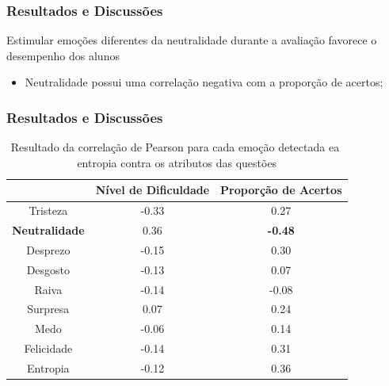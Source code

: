\documentclass{beamer}
\begin{document}

\begin{frame}
\frametitle{Resultados e Discuss\~oes}
\begin{block}{Estimular emo\c{c}\~oes diferentes da neutralidade durante a avalia\c{c}\~ao favorece o desempenho dos alunos}
\begin{itemize}
\pause
\item Neutralidade possui uma correla\c{c}\~ao negativa com a propor\c{c}\~ao de acertos;
\end{itemize}
\end{block}

\end{frame}

\begin{frame}
\frametitle{Resultados e Discuss\~oes}
\begin{table}[]\footnotesize
\centering
\caption{Resultado​ ​da​ ​correla\c{c}\~ao​ ​de​ ​Pearson​ ​para​ ​cada​ ​emo\c{c}\~ao​ ​detectada
e​ ​a​ ​entropia​ ​contra​ ​os​ ​atributos​ ​das​ ​quest\~oes}
\label{my-label}
\begin{tabular}{|c|c|c|}
\hline
                      & \textbf{Nível de Dificuldade} & \textbf{Proporção de Acertos} \\ \hline
Tristeza	     & -0.33                & 0.27                          \\ \hline
\small \textbf{Neutralidade} & 0.36                 & \small \textbf{-0.48}                \\ \hline
Desprezo     		& -0.15                         & 0.30                 \\ \hline
Desgosto              & -0.13                         & 0.07                          \\ \hline
Raiva                 & -0.14                         & -0.08                         \\ \hline
Surpresa              & 0.07                          & 0.24                          \\ \hline
Medo                  & -0.06                         & 0.14                          \\ \hline
Felicidade   		& -0.14                         & 0.31                 \\ \hline
Entropia     		& -0.12                         & 0.36                 \\ \hline
\end{tabular}
\end{table}
\end{frame}
\end{document}
